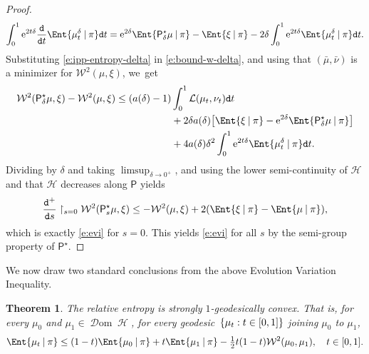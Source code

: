 \documentclass[10pt]{amsart}
\newtheorem{theorem}{Theorem}[section]
\theoremstyle{definition}
\theoremstyle{remark}
\DeclarePairedDelimiter{\bracket}{\lbrack}{\rbrack}
\DeclarePairedDelimiter{\set}{\lbrace}{\rbrace}
\newcommand{\given}[1][]{%
\nonscript\:#1\vert
\allowbreak
\nonscript\:
\mathopen{}}
\DeclareMathOperator{\ent}{\mathcal{H}}
\DeclareMathOperator{\dom}{\mathscr{D}om}
\begin{document}
\begin{proof}
\begin{equation}\label{e:ipp-entropy-delta}
\int_{0}^{1} \mathrm{e}^{2t\delta} \frac{\mathtt{d}}{\mathtt{d} t} \Ent{ \mu_{t}^{\delta} \given \pi } \mathtt{d} t = \mathrm{e}^{2\delta} \Ent{ \mathsf{P}^{\star}_{\delta}\mu \given \pi } - \Ent{ \xi \given \pi } - 2 \delta \int_{0}^{1} \mathrm{e}^{2t\delta} \Ent{ \mu_{t}^{\delta} \given \pi } \mathtt{d} t.
\end{equation}
Substituting \cref{e:ipp-entropy-delta} in \cref{e:bound-w-delta}, and using that $(\bar{\mu}, \bar{\nu})$ is a minimizer for $\mathcal{W}^{2}(\mu, \xi)$, we~get
\begin{equation*}
\begin{split}
\mathcal{W}^{2}(\mathsf{P}^{\star}_{\delta}\mu, \xi) - \mathcal{W}^{2}(\mu, \xi) \leq (a(\delta) - 1)& \int_{0}^{1} \mathcal{L}(\mu_{t}, \nu_{t}) \mathtt{d} t \\
&+ 2 \delta a(\delta) \bracket*{ \Ent{ \xi \given \pi } - \mathrm{e}^{2\delta} \Ent{ \mathsf{P}^{\star}_{\delta}\mu \given \pi } } \\
&+ 4 a(\delta) \delta^{2} \int_{0}^{1} \mathrm{e}^{2t\delta} \Ent{ \mu_{t}^{\delta} \given \pi } \mathtt{d} t.
\end{split}
\end{equation*}
Dividing by $\delta$ and taking $\limsup_{\delta \to 0^{+}}$, and using the lower semi-continuity of $\mathcal{H}$ and that $\mathcal{H}$ decreases along $\mathsf{P}$ yields
\begin{equation*}
\frac{\mathtt{d}^{+}}{\mathtt{d} s} \restriction_{s=0} \mathcal{W}^{2}(\mathsf{P}^{\star}_{s}\mu, \xi) \leq -\mathcal{W}^{2}(\mu, \xi) + 2 (\Ent{ \xi \given \pi } - \Ent{ \mu \given \pi }),
\end{equation*}
which is exactly \cref{e:evi} for $s = 0$.
This yields \cref{e:evi} for all $s$ by the semi-group property of $\mathsf{P}^{\star}$.
\end{proof}

We now draw two standard conclusions from the above Evolution Variation Inequality.

\begin{theorem}\label{t:entropy-geodesically-convex}
The relative entropy is strongly $1$-geodesically convex.
That is, for every $\mu_{0}$ and $\mu_{1} \in \dom \ent$, for every geodesic~$\set{ \mu_{t} : t \in [0,1] }$ joining $\mu_{0}$ to $\mu_{1}$,
\begin{equation*}
\Ent{\mu_{t} \given \pi} \leq (1-t) \Ent{\mu_{0} \given \pi} + t \Ent{\mu_{1} \given \pi} - \tfrac{1}{2}t(1-t) \mathcal{W}^{2}(\mu_{0}, \mu_{1}), \quad t \in [0,1].
\end{equation*}
\end{theorem}
\end{document}
